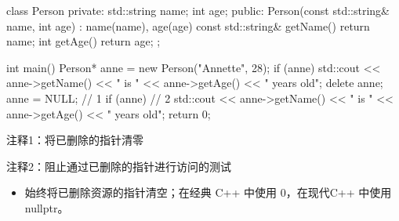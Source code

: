 \begin{cpp}
class Person {
private:
  std::string name;
  int age;
public:
  Person(const std::string& name, int age) : name(name), age(age) {}
  const std::string& getName() { return name; }
  int getAge() { return age; }
};

int main() {
  Person* anne = new Person("Annette", 28);
  if (anne)
    std::cout << anne->getName() << " is " << anne->getAge() << " years old\n";
  delete anne;
  anne = NULL; // 1
  if (anne) // 2
    std::cout << anne->getName() << " is " << anne->getAge() << " years old\n";
  return 0;
}
\end{cpp}

{\footnotesize
注释1：将已删除的指针清零

注释2：阻止通过已删除的指针进行访问的测试
}


\begin{itemize}
\item
始终将已删除资源的指针清空；在经典 C++ 中使用 0，在现代C++ 中使用 nullptr。
\end{itemize}










